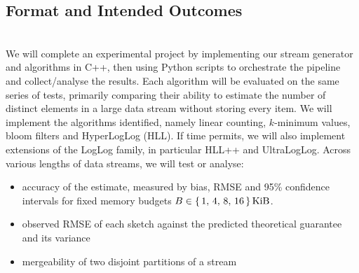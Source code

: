 

\subsection{Format and Intended Outcomes}
 \\
We will complete an experimental project by implementing our stream generator and algorithms in C++, then using Python scripts to orchestrate the pipeline and collect/analyse the results. Each algorithm will be evaluated on the same series of tests, primarily comparing their ability to estimate the number of distinct elements in a large data stream without storing every item. 
We will implement the algorithms identified, namely linear counting, $k$-minimum values, bloom filters and HyperLogLog (HLL). If time permits, we will also implement extensions of the LogLog family, in particular HLL++ and UltraLogLog. Across various lengths of data streams, we will test or analyse:

\begin{itemize}[noitemsep]
    \item accuracy of the estimate, measured by bias, RMSE and 95\% confidence intervals for fixed memory budgets $B \in \{ \, 1, \, 4, \, 8, \, 16 \, \} \, \text{KiB}$.
    \item observed RMSE of each sketch against the predicted theoretical guarantee and its variance
    \item mergeability of two disjoint partitions of a stream  
\end{itemize}


